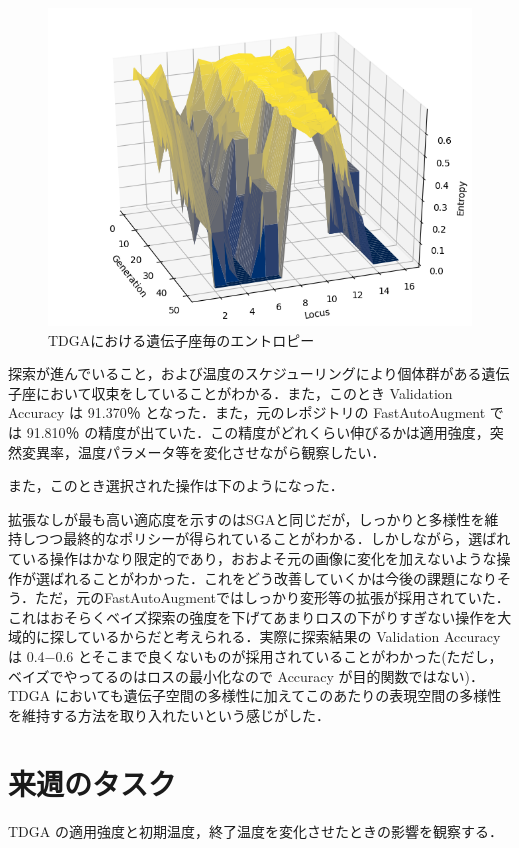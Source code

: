 \documentclass[onecolumn]{ujarticle}   %
\begin{document}
  \begin{figure}[h]
		\begin{center}
			\includegraphics[width=0.7\columnwidth]{entropy_TDGA.png}
			\caption{TDGAにおける遺伝子座毎のエントロピー}
			\label{fig:TDGA_entropy}
		\end{center}
	\end{figure}

  探索が進んでいること，および温度のスケジューリングにより個体群がある遺伝子座において収束をしていることがわかる．また，このとき Validation Accuracy は 91.370％ となった．また，元のレポジトリの FastAutoAugment では  91.810％ の精度が出ていた．この精度がどれくらい伸びるかは適用強度，突然変異率，温度パラメータ等を変化させながら観察したい．

  また，このとき選択された操作は下のようになった．
  

  拡張なしが最も高い適応度を示すのはSGAと同じだが，しっかりと多様性を維持しつつ最終的なポリシーが得られていることがわかる．しかしながら，選ばれている操作はかなり限定的であり，おおよそ元の画像に変化を加えないような操作が選ばれることがわかった．これをどう改善していくかは今後の課題になりそう．ただ，元のFastAutoAugmentではしっかり変形等の拡張が採用されていた．これはおそらくベイズ探索の強度を下げてあまりロスの下がりすぎない操作を大域的に探しているからだと考えられる．実際に探索結果の Validation Accuracy は 0.4−0.6 とそこまで良くないものが採用されていることがわかった(ただし，ベイズでやってるのはロスの最小化なので Accuracy が目的関数ではない)．TDGA においても遺伝子空間の多様性に加えてこのあたりの表現空間の多様性を維持する方法を取り入れたいという感じがした．

	\section{来週のタスク}
	TDGA の適用強度と初期温度，終了温度を変化させたときの影響を観察する．

\end{document}
